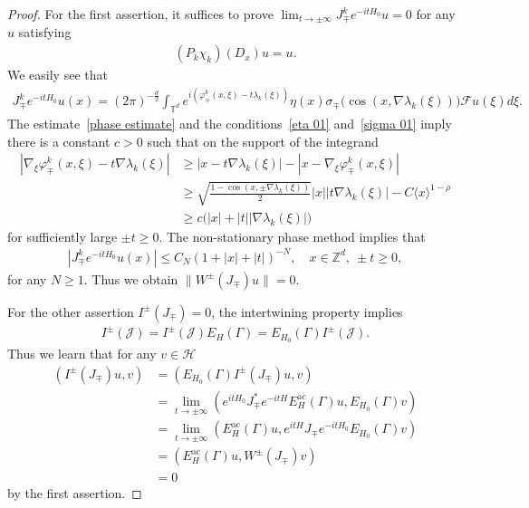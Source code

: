 \documentclass[AHL,Unicode,longabstracts,published]{cedram}
\newcommand{\f}{\varphi}
\newcommand{\x}{\xi}
\newcommand{\s}{\sigma}
\newcommand{\Z}{\mathbb{Z}}
\newcommand{\T}{\mathbb{T}}
\newcommand{\HS}{\mathcal{H}}
\newcommand{\JS}{\mathcal{J}}
\newcommand{\FS}{\mathcal{F}}
\newcommand{\ac}{\mathrm{ac}}
\newcommand{\jap}[1]{\langle #1 \rangle}
\newcommand{\Z}{\mathbb{Z}}
\newcommand{\HS}{\mathcal{H}}
\begin{document}
\begin{proof}
For the first assertion, it suffices to prove $\lim_{t\to\pm\infty} J_\mp^k e^{-itH_0}u=0$ for any $u$ satisfying
\begin{align*}
(P_k\chi_k)(D_x)u=u.
\end{align*}
We easily see that
\begin{align*}
J_\mp^k e^{-itH_0} u(x) 
=(2\pi)^{-\frac{d}{2}} \int_{\T^d} e^{i\left(\f_\mp^k(x,\x)-t\lambda_k(\x)\right)} \eta(x)\s_\mp\bigl(\cos(x,\nabla\lambda_k(\x))\bigr) \FS u(\x)d\x.
\end{align*}
The estimate~\eqref{phase estimate} and the conditions~\eqref{eta 01} and~\eqref{sigma 01} imply there is a constant $c>0$ such that on the support of the integrand
\begin{align*}
\left|\nabla_\x \f_\mp^k(x,\x)-t\nabla\lambda_k(\x)\right|
&\geq |x-t\nabla\lambda_k(\x)| - \left|x-\nabla_\x\f_\mp^k(x,\x)\right| \\
&\geq \sqrt{\frac{1-\cos(x,\pm\nabla\lambda_k(\x))}{2}}|x| |t\nabla\lambda_k(\x)| - C\jap{x}^{1-\rho} \\
&\geq c \big(|x| + |t| |\nabla\lambda_k(\x)|\big)
\end{align*}
for sufficiently large $\pm t \geq 0$. The non-stationary phase method implies that
\begin{align*}
\left|J_\mp^k e^{-itH_0} u(x)\right|\leq C_{N}(1+|x|+|t|)^{-N}, \quad x\in\Z^d,\ \pm t \geq0,
\end{align*}
for any $N\geq1$. Thus we obtain $\|W^\pm(J_\mp)u\| = 0$.

For the other assertion $I^\pm(J_\mp) = 0$, the intertwining property implies
\begin{align*}
I^\pm(\JS)=I^\pm(\JS) E_H(\Gamma) = E_{H_0}(\Gamma) I^\pm(\JS).
\end{align*}
Thus we learn that for any $v\in\HS$
\begin{align*}
\left(I^\pm(J_\mp)u, v\right) &= \left(E_{H_0}(\Gamma) I^\pm(J_\mp)u, v\right) \\
&= \lim_{t\to\pm\infty} \left(e^{itH_0} J_\mp^* e^{-itH} E_{H}^{\ac}(\Gamma) u, E_{H_0}(\Gamma) v\right) \\
&= \lim_{t\to\pm\infty} \left(E_{H}^{\ac}(\Gamma) u, e^{itH} J_\mp e^{-itH_0} E_{H_0}(\Gamma) v\right) \\
&= \left(E_{H}^{\ac}(\Gamma) u, W^\pm(J_\mp) v\right) \\
&= 0
\end{align*}
by the first assertion.
\end{proof}
\end{document}
